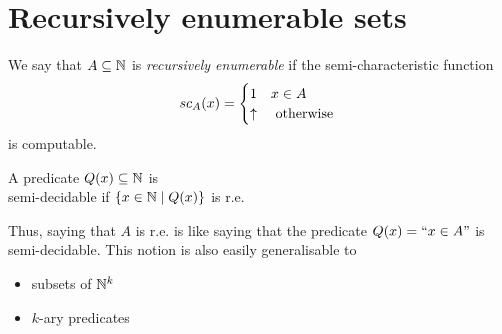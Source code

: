 \chapter{Recursively enumerable sets}

\begin{definition}
  We say that $A \subseteq \mathbb{N}$ is \emph{recursively enumerable} if
  the semi-characteristic function 
  \begin{equation*}
    sc_A(x) = \begin{cases} 1 & x \in A \\ \uparrow & $
      otherwise $
    \end{cases}
  \end{equation*}
  is computable.
\end{definition}

\begin{definition}
  A predicate $Q(x) \subseteq \mathbb{N}$ is\\
   semi-decidable if 
  \( \{ x \in \mathbb{N} \mid Q(x) \} \)
  is r.e.
\end{definition}

Thus, saying that $A$ is r.e. is like saying that the predicate $ Q(x)=``x \in A"
$ is semi-decidable. This notion is also easily generalisable to
\begin{itemize}
\item subsets of $\mathbb{N}^k$
\item $k$-ary predicates
\end{itemize}

